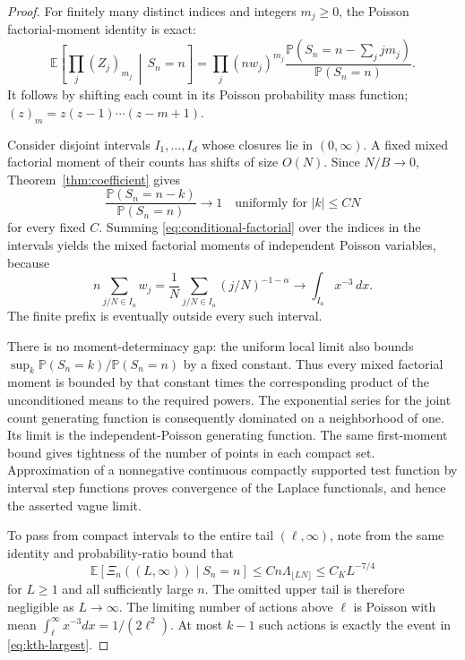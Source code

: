 \documentclass[11pt,a4paper]{article}
\numberwithin{equation}{section}
\theoremstyle{definition}
\theoremstyle{remark}
\newcommand{\E}{\mathbb E}
\newcommand{\Pp}{\mathbb P}
\begin{document}
\begin{proof}
For finitely many distinct indices and integers \(m_j\ge0\), the Poisson
factorial-moment identity is exact:
\begin{equation}
 \E\left[\prod_j(Z_j)_{m_j}\,\middle|\,S_n=n\right]
 =\prod_j(nw_j)^{m_j}
 \frac{\Pp(S_n=n-\sum_jjm_j)}{\Pp(S_n=n)}.
 \label{eq:conditional-factorial}
\end{equation}
It follows by shifting each count in its Poisson probability mass function;
\((z)_m=z(z-1)\cdots(z-m+1)\).

Consider disjoint intervals \(I_1,\dots,I_d\) whose closures lie in
\((0,\infty)\). A fixed mixed factorial moment of their counts has shifts
of size \(O(N)\). Since \(N/B\to0\),
Theorem~\ref{thm:coefficient} gives
\[
 \frac{\Pp(S_n=n-k)}{\Pp(S_n=n)}\longrightarrow1
 \quad\text{uniformly for } |k|\le C N
\]
for every fixed \(C\). Summing \eqref{eq:conditional-factorial} over the
indices in the intervals yields the mixed factorial moments of independent
Poisson variables, because
\begin{equation}
 n\sum_{j/N\in I_a}w_j
 =\frac1N\sum_{j/N\in I_a}(j/N)^{-1-\alpha}
 \longrightarrow\int_{I_a}x^{-3}\,dx.
 \label{eq:intensity-riemann}
\end{equation}
The finite prefix is eventually outside every such interval.

There is no moment-determinacy gap: the uniform local limit also bounds
\(\sup_k\Pp(S_n=k)/\Pp(S_n=n)\) by a fixed constant. Thus every mixed
factorial moment is bounded by that constant times the corresponding
product of the unconditioned means to the required powers. The exponential
series for the joint count generating function is consequently dominated
on a neighborhood of one. Its limit is the independent-Poisson generating
function. The same first-moment bound gives tightness of the number of
points in each compact set. Approximation of a nonnegative continuous
compactly supported test function by interval step functions proves
convergence of the Laplace functionals, and hence the asserted vague limit.

To pass from compact intervals to the entire tail \((\ell,\infty)\), note
from the same identity and probability-ratio bound that
\[
 \E[\Xi_n((L,\infty))\mid S_n=n]
 \le Cn\Lambda_{\lfloor LN\rfloor}\le C_K L^{-7/4}
\]
for \(L\ge1\) and all sufficiently large \(n\).
The omitted upper tail is therefore negligible as \(L\to\infty\).
The limiting number of actions above \(\ell\) is Poisson with mean
\(\int_\ell^\infty x^{-3}dx=1/(2\ell^2)\). At most \(k-1\) such actions
is exactly the event in \eqref{eq:kth-largest}.
\end{proof}
\end{document}
